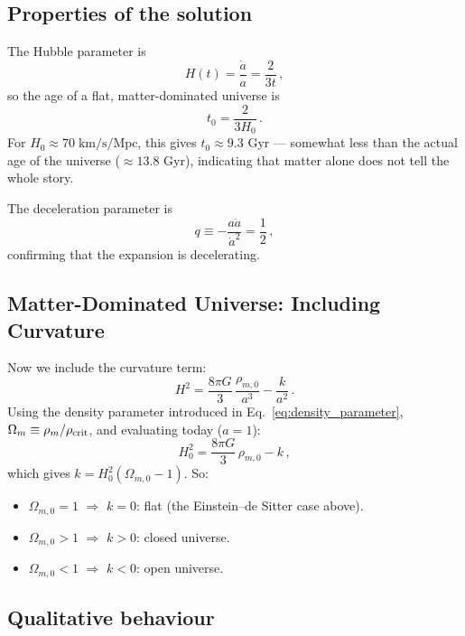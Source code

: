 \subsection*{Properties of the solution}

The Hubble parameter is
\begin{equation}
    H(t) = \frac{\dot{a}}{a} = \frac{2}{3t}\,,
\end{equation}
so the age of a flat, matter-dominated universe is
\begin{equation}
    t_0 = \frac{2}{3H_0}\,.
\end{equation}
For $H_0\approx 70\;\text{km/s/Mpc}$, this gives $t_0\approx 9.3$ Gyr --- somewhat less than the actual age of the universe ($\approx 13.8$ Gyr), indicating that matter alone does not tell the whole story.

The deceleration parameter is
\begin{equation}
    q \equiv -\frac{a\ddot{a}}{\dot{a}^2} = \frac{1}{2}\,,
\end{equation}
confirming that the expansion is decelerating.


\subsection{Matter-Dominated Universe: Including Curvature}

Now we include the curvature term:
\begin{equation}\label{eq:fried_matter_k}
    H^2 = \frac{8\pi G}{3}\,\frac{\rho_{m,0}}{a^3} - \frac{k}{a^2}\,.
\end{equation}
Using the density parameter introduced in Eq.~\eqref{eq:density_parameter}, $\Omega_m \equiv \rho_m/\rho_{\rm crit}$, and evaluating today ($a=1$):
\begin{equation}
    H_0^2 = \frac{8\pi G}{3}\,\rho_{m,0} - k\,,
\end{equation}
which gives $k = H_0^2(\Omega_{m,0}-1)$. So:
\begin{itemize}
    \item $\Omega_{m,0}=1$ $\Rightarrow$ $k=0$: flat (the Einstein--de Sitter case above).
    \item $\Omega_{m,0}>1$ $\Rightarrow$ $k>0$: closed universe.
    \item $\Omega_{m,0}<1$ $\Rightarrow$ $k<0$: open universe.
\end{itemize}

\subsection*{Qualitative behaviour}

